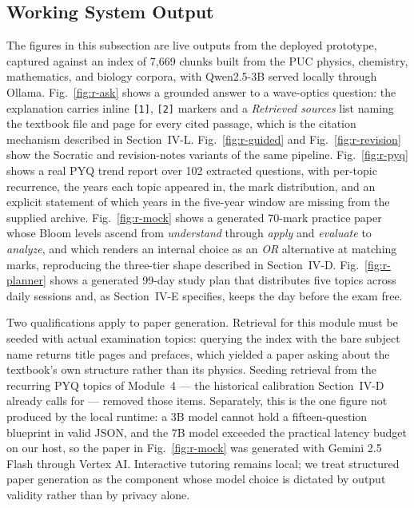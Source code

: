\documentclass[conference]{IEEEtran}
\begin{document}
\subsection{Working System Output}
The figures in this subsection are live outputs from the deployed
prototype, captured against an index of 7{,}669 chunks built from the
PUC physics, chemistry, mathematics, and biology corpora, with
Qwen2.5-3B served locally through Ollama. Fig.~\ref{fig:r-ask} shows a
grounded answer to a wave-optics question: the explanation carries
inline \texttt{[1]}, \texttt{[2]} markers and a \emph{Retrieved
sources} list naming the textbook file and page for every cited
passage, which is the citation mechanism described in
Section~IV-L. Fig.~\ref{fig:r-guided} and Fig.~\ref{fig:r-revision}
show the Socratic and revision-notes variants of the same pipeline.
Fig.~\ref{fig:r-pyq} shows a real PYQ trend report over 102 extracted
questions, with per-topic recurrence, the years each topic appeared in,
the mark distribution, and an explicit statement of which years in the
five-year window are missing from the supplied archive.
Fig.~\ref{fig:r-mock} shows a generated 70-mark practice paper whose
Bloom levels ascend from \emph{understand} through \emph{apply} and
\emph{evaluate} to \emph{analyze}, and which renders an internal choice
as an \emph{OR} alternative at matching marks, reproducing the
three-tier shape described in Section~IV-D.
Fig.~\ref{fig:r-planner} shows a generated 99-day study plan that
distributes five topics across daily sessions and, as
Section~IV-E specifies, keeps the day before the exam free.

Two qualifications apply to paper generation. Retrieval for this module
must be seeded with actual examination topics: querying the index with
the bare subject name returns title pages and prefaces, which yielded a
paper asking about the textbook's own structure rather than its physics.
Seeding retrieval from the recurring PYQ topics of Module~4 --- the
historical calibration Section~IV-D already calls for --- removed those
items. Separately, this is the one figure not produced by the local
runtime: a 3B model cannot hold a fifteen-question blueprint in valid
JSON, and the 7B model exceeded the practical latency budget on our
host, so the paper in Fig.~\ref{fig:r-mock} was generated with Gemini
2.5 Flash through Vertex AI. Interactive tutoring remains local; we
treat structured paper generation as the component whose model choice
is dictated by output validity rather than by privacy alone.
\end{document}
